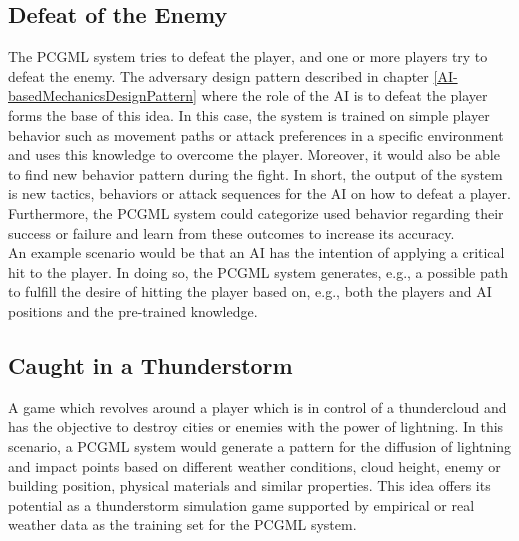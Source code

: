 \documentclass[MGS,Master,english]{twbook}%
\begin{document}
\subsection{Defeat of the Enemy} \label{idea::defeatTheEnemy}
The PCGML system tries to defeat the player, and one or more players try to defeat the enemy. The adversary design pattern described in chapter \ref{AI-basedMechanicsDesignPattern} where the role of the AI is to defeat the player forms the base of this idea. In this case, the system is trained on simple player behavior such as movement paths or attack preferences in a specific environment and uses this knowledge to overcome the player. Moreover, it would also be able to find new behavior pattern during the fight. In short, the output of the system is new tactics, behaviors or attack sequences for the AI on how to defeat a player. Furthermore, the PCGML system could categorize used behavior regarding their success or failure and learn from these outcomes to increase its accuracy. \\
An example scenario would be that an AI has the intention of applying a critical hit to the player. In doing so, the PCGML system generates, e.g., a possible path to fulfill the desire of hitting the player based on, e.g., both the players and AI positions and the pre-trained knowledge.

\subsection{Caught in a Thunderstorm} \label{idea::caughtInAThunderstorm}
A game which revolves around a player which is in control of a thundercloud and has the objective to destroy cities or enemies with the power of lightning. In this scenario, a PCGML system would generate a pattern for the diffusion of lightning and impact points based on different weather conditions, cloud height, enemy or building position, physical materials and similar properties. This idea offers its potential as a thunderstorm simulation game supported by empirical or real weather data as the training set for the PCGML system.
\end{document}
